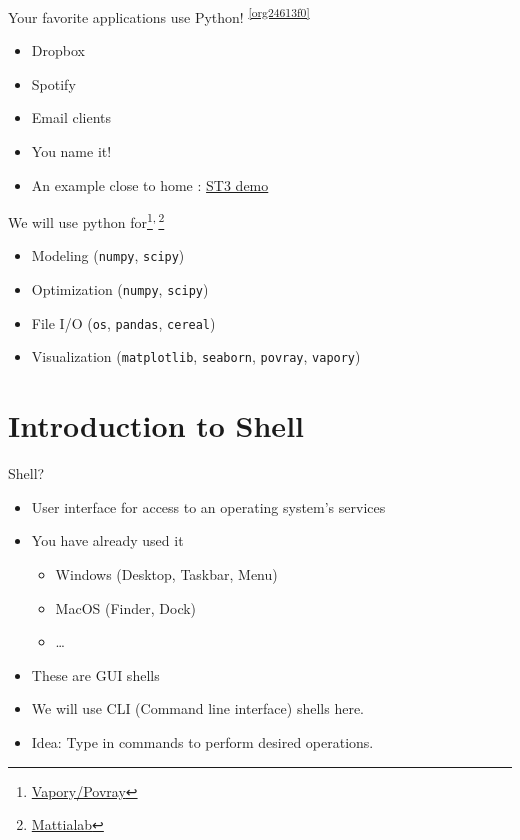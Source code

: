 \documentclass[presentation]{beamer}
\begin{document}
\begin{frame}[label={sec:orgebe8d30}]{Your favorite applications use Python! \textsuperscript{\cref{org24613f0}}}
\begin{itemize}
\item Dropbox
\item Spotify
\item Email clients
\item You name it!
\item An example close to home : \href{code/clangformat.cpp}{ST3 demo}
\end{itemize}
\end{frame}

\begin{frame}[label={sec:orgcf08072},fragile]{We will use python for\footnote{\href{https://zulko.github.io/blog/2014/11/13/things-you-can-do-with-python-and-pov-ray/\#disqus\_thread}{Vapory/Povray}}\textsuperscript{,}\,\footnote{\href{http://mattia-lab.com/work/soft-filaments/}{Mattialab}}}
 \begin{itemize}
\item Modeling (\texttt{numpy}, \texttt{scipy})
\item Optimization (\texttt{numpy}, \texttt{scipy})
\item File I/O (\texttt{os}, \texttt{pandas}, \texttt{cereal})
\item Visualization (\texttt{matplotlib}, \texttt{seaborn}, \texttt{povray}, \texttt{vapory})
\end{itemize}
\end{frame}

\section{Introduction to Shell}
\label{sec:orgc10322d}
\begin{frame}[label={sec:org1cf10a6}]{Shell?}
\begin{itemize}
\item User interface for access to an operating system's services
\item You have already used it
\begin{itemize}
\item Windows (Desktop, Taskbar, Menu)
\item MacOS (Finder, Dock)
\item \ldots{}
\end{itemize}
\item These are GUI shells
\item We will use CLI (Command line interface) shells here.
\item Idea: Type in commands to perform desired operations.
\end{itemize}
\end{frame}
\end{document}
